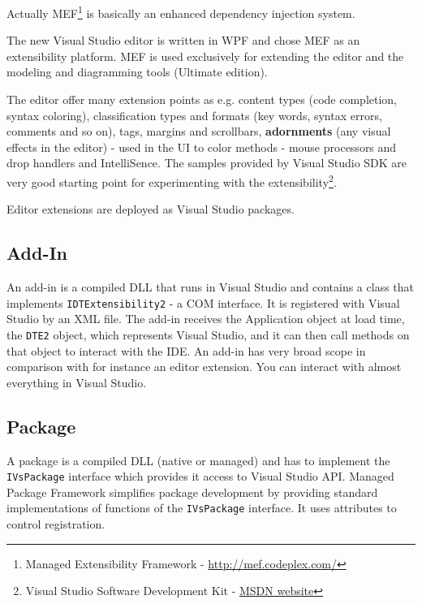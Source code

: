 Actually MEF\footnote{Managed Extensibility Framework - \href{http://mef.codeplex.com/}{http://mef.codeplex.com/} } 
is basically an enhanced dependency injection system. 

The new Visual Studio editor is written in WPF and chose MEF as an extensibility platform. MEF is used exclusively for extending the editor and the modeling and diagramming tools (Ultimate edition).

The editor offer many extension points as e.g. content types (code completion, syntax coloring), classification types and formats (key words, syntax errors, comments and so on), tags, margins and scrollbars, \textbf{adornments} (any visual effects in the editor) - used in the UI to color methods - mouse processors and drop handlers and IntelliSence. The samples provided by Visual Studio SDK are very good starting point for experimenting with the extensibility\footnote{Visual Studio Software Development Kit - \href{http://msdn.microsoft.com/en-us/library/bb166441(v=VS.100).aspx}{MSDN website}}.

Editor extensions are deployed as Visual Studio packages.

\subsection{Add-In}
An add-in is a compiled DLL that runs in Visual Studio and contains a class that implements \texttt{IDTExtensibility2} - a COM interface. It is registered with Visual Studio by an XML file. The add-in receives the Application object  at load time, the \texttt{DTE2} object, which represents Visual Studio, and it can then call methods on that object to interact with the IDE. An add-in has very broad scope in comparison with for instance an editor extension. You can interact with almost everything in Visual Studio.

\subsection{Package}
A package is a compiled DLL (native or managed) and has to implement the \texttt{IVsPackage} interface which provides it access to Visual Studio API. Managed Package Framework simplifies package development by providing standard implementations of functions of the \texttt{IVsPackage} interface. It uses attributes to control registration.

